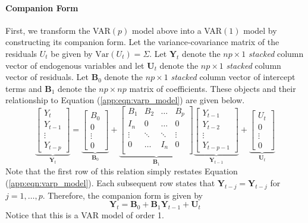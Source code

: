 \documentclass[12pt]{article}
\newcommand{\Var}{\mathrm{Var}}
\begin{document}
\paragraph{Companion Form} First, we transform the VAR$(p)$ model above into a VAR$(1)$ model by constructing its companion form. Let the variance-covariance matrix of the residuals $U_t$ be given by $\Var (U_t) = \Sigma$. Let $\mathbf{Y}_{t}$ denote the $np \times 1$ \textit{stacked} column vector of endogenous variables and let $\mathbf{U}_{t}$ denote the $np \times 1$ \textit{stacked} column vector of residuals. Let $\mathbf{B}_0$ denote the $np \times 1$ \textit{stacked} column vector of intercept terms and $\mathbf{B}_1$ denote the $np \times np$ matrix of coefficients. These objects and their relationship to Equation (\ref{app:eqn:varp_model}) are given below.
$$
\underbrace{\begin{bmatrix}
Y_{t} \\
Y_{t-1} \\
\vdots \\
Y_{t-p}
\end{bmatrix}}_{\mathbf{Y}_{t}}
= 
\underbrace{\begin{bmatrix}
B_0 \\
0 \\
\vdots \\
0
\end{bmatrix}}_{\mathbf{B}_0}
+
\underbrace{\begin{bmatrix}
B_1 & B_2 & \dots & B_p \\
I_n & 0 & \dots & 0 \\
\vdots & \ddots & \ddots & \vdots \\
0 & \dots & I_n & 0 \\
\end{bmatrix}}_{\mathbf{B}_1}
\underbrace{\begin{bmatrix}
Y_{t-1} \\
Y_{t-2} \\
\vdots \\
Y_{t-p-1}
\end{bmatrix}}_{\mathbf{Y}_{t-1}}
+
\underbrace{\begin{bmatrix}
U_{t} \\
0 \\
\vdots \\
0
\end{bmatrix}}_{\mathbf{U}_{t}}
$$
Note that the first row of this relation simply restates Equation (\ref{app:eqn:varp_model}). Each subsequent row states that $\mathbf{Y}_{t-j} = \mathbf{Y}_{t-j}$ for $j = 1,\dots,p$. Therefore, the companion form is given by 
\begin{equation}\label{app:eqn:companion_form}
\mathbf{Y}_t = \mathbf{B}_0 + \mathbf{B}_1 \mathbf{Y}_{t-1} + \mathbf{U}_t 
\end{equation}
Notice that this is a VAR model of order 1.
\end{document}
